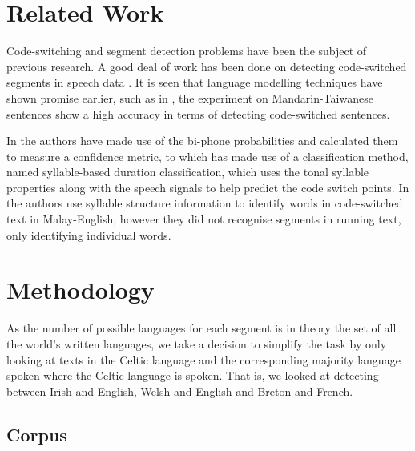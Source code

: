 \documentclass[11pt]{article}
\begin{document}
\section{Related Work}
\label{sec:relwork}

Code-switching and segment detection problems have been the subject of previous research. A good deal of work
has been done on detecting code-switched segments in speech data \cite{chan2004detection,lyu2006language}.
It is seen that language modelling techniques have shown promise earlier, such as in , 
the experiment on Mandarin-Taiwanese sentences show a high accuracy in terms of detecting code-switched sentences. 

In  the authors have made use of the bi-phone probabilities and calculated them to measure a confidence metric, 
to \cite{lyu2006language} which has made use of a classification method, named syllable-based duration classification, 
which uses the tonal syllable properties along with the speech signals to help predict the code switch points. In  
 the authors use syllable structure information to identify words in code-switched text in Malay-English, however they did not 
recognise segments in running text, only identifying individual words.


\section{Methodology}
\label{sec:method}

As the number of possible languages for each segment is in theory the set of all the world's written languages, we take 
a decision to simplify the task by only looking at texts in the Celtic language and the corresponding majority language spoken
where the Celtic language is spoken. That is, we looked at detecting between Irish and English, Welsh and English 
and Breton and French.

\subsection{Corpus}
\end{document}
